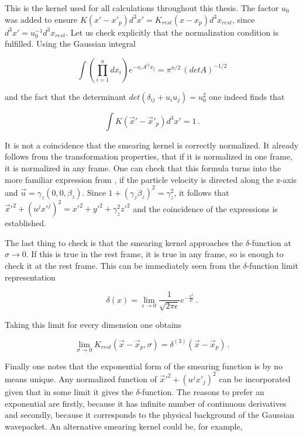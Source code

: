 This is the kernel used for all calculations throughout this thesis.
The factor $u_0$ was added to ensure  $ K(x' - x'_p) d^3x' = K_{rest}(x - x_p)
d^3x_{rest}$, since $d^3x' = u_0^{-1} d^3x_{rest}$. Let us check explicitly
that the normalization condition is fulfilled. Using the Gaussian integral

\begin{equation}
  \int \left( \prod_{i=1}^{n} dx_i \right) e^{-x_i A^{ij} x_j}  = \pi^{n/2} \, (det A)^{-1/2}
\end{equation}

and the fact that the determinant $det(\delta_{ij} + u_i u_j) = u_0^2$ one
indeed finds that

\begin{equation}
  \int K(\vec{x}' - \vec{x}'_p) d^3x' = 1 \,.
\end{equation}

It is not a coincidence that the smearing kernel is correctly normalized.
It already follows from the transformation properties, that if it is
normalized in one frame, it is normalized in any frame. One can check that this
formula turns into the more familiar expression from \cite{Huovinen:2012is}, if
the particle velocity is directed along the z-axis and $\vec{u} = \gamma_z(0, 0,
\beta_z)$. Since $1 + (\gamma_z \beta_z)^2 = \gamma_z^2$, it follows that
$\vec{x}'^2 + (u^j x'^j)^2 = x'^2 + y'^2 + \gamma_z^2 z'^2$ and the coincidence
of the expressions is established.

The last thing to check is that the smearing kernel approaches the $\delta$-function
at $\sigma \to 0$. If this is true in the rest frame, it is true in any frame,
so is enough to check it at the rest frame. This can be immediately seen from
 the $\delta$-function limit representation

\begin{equation}
  \delta(x) = \lim_{\epsilon \to 0} \frac{1}{\sqrt{2 \pi \epsilon}} e^{- \frac{x^2}{2\epsilon}} \,.
\end{equation}

Taking this limit for every dimension one obtains

\begin{equation}
  \lim_{\sigma \to 0} K_{rest}(\vec{x} - \vec{x}_p, \sigma) =
  \delta^{(3)}(\vec{x} - \vec{x}_p) \,.
\end{equation}

Finally one notes that the exponential form of the smearing function is by no
means unique. Any normalized function of $\vec{x}'^2 + (u^j x'_j)^2$ can be
incorporated given that in some limit it gives the $\delta$-function. The reasons to
prefer an exponential are firstly, because it has infinite number of continuous
derivatives and secondly, because it corresponds to the physical background of the Gaussian wavepacket.  An alternative smearing kernel could be, for example,

